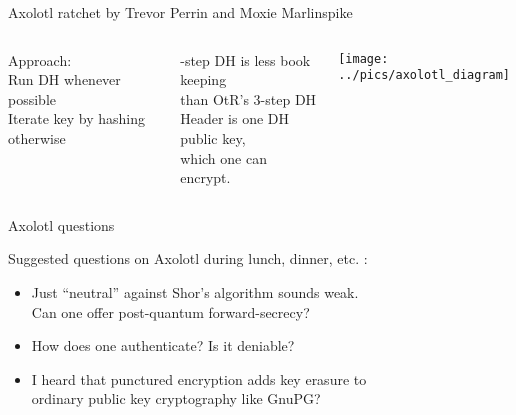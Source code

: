 \documentclass[fleqn,xcolor={usenames,dvipsnames}]{beamer}
\begin{document}
\begin{frame}{Axolotl ratchet by Trevor Perrin and Moxie Marlinspike}
\begin{columns}[T]
Approach: \\
\hspace*{2pt} Run DH whenever possible \\
\hspace*{2pt} Iterate key by hashing otherwise 

-step DH is less book keeping \\
\hspace*{2pt} than OtR's 3-step DH \\

\medskip
Header is one DH public key, \\
\hspace*{2pt} which one can encrypt.


\texttt{[image: ../pics/axolotl\_diagram]}
\end{columns}
\end{frame}


\begin{frame}{Axolotl questions}

Suggested questions on Axolotl during lunch, dinner, etc. : 

\medskip
\begin{itemize}
\item Just ``neutral'' against Shor's algorithm sounds weak.  \\ 
  Can one offer post-quantum forward-secrecy? \\ \medskip
\item How does one authenticate?  Is it deniable? \\ \medskip
\item I heard that punctured encryption adds key erasure to \\
  ordinary public key cryptography like GnuPG? \\
\end{itemize}

\end{frame}
\end{document}
